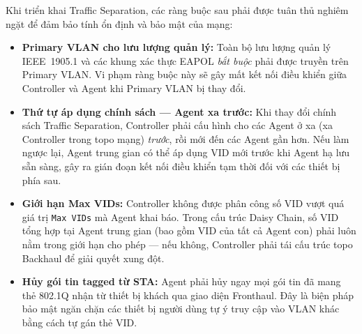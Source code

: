 Khi triển khai Traffic Separation, các ràng buộc sau phải được tuân thủ nghiêm ngặt
để đảm bảo tính ổn định và bảo mật của mạng:

\begin{itemize}
	\item \textbf{Primary VLAN cho lưu lượng quản lý:} Toàn bộ lưu lượng quản lý
	IEEE~1905.1 và các khung xác thực EAPOL \textit{bắt buộc} phải được truyền
	trên Primary VLAN. Vi phạm ràng buộc này sẽ gây mất kết nối điều
	khiển giữa Controller và Agent khi Primary VLAN bị thay đổi.
	
	\item \textbf{Thứ tự áp dụng chính sách --- Agent xa trước:} Khi thay đổi chính
	sách Traffic Separation, Controller phải cấu hình cho các Agent ở xa (xa
	Controller trong topo mạng) \textit{trước}, rồi mới đến các Agent gần
	hơn. Nếu làm ngược lại, Agent trung gian có thể áp dụng VID mới trước
	khi Agent hạ lưu sẵn sàng, gây ra gián đoạn kết nối điều khiển tạm thời
	đối với các thiết bị phía sau.
	
	\item \textbf{Giới hạn Max VIDs:} Controller không được phân công số VID vượt quá
	giá trị \texttt{Max VIDs} mà Agent khai báo. Trong cấu trúc Daisy Chain, số
	VID tổng hợp tại Agent trung gian (bao gồm VID của tất cả Agent con) phải
	luôn nằm trong giới hạn cho phép --- nếu không, Controller phải tái cấu trúc
	topo Backhaul để giải quyết xung đột.
	
	\item \textbf{Hủy gói tin tagged từ STA:} Agent phải hủy ngay mọi gói tin đã mang
	thẻ 802.1Q nhận từ thiết bị khách qua giao diện Fronthaul. Đây là biện
	pháp bảo mật ngăn chặn các thiết bị người dùng tự ý truy cập vào VLAN khác
	bằng cách tự gán thẻ VID.
\end{itemize}